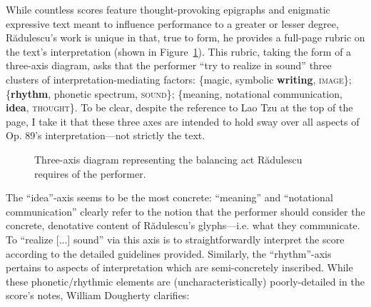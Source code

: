        While countless scores feature thought-provoking epigraphs and enigmatic expressive text meant to influence performance to a greater or lesser degree, R\u{a}dulescu's work is unique in that, true to form, he provides a full-page rubric on the text's interpretation (shown in Figure~\ref{fig:radulescu_triaxial}). This rubric, taking the form of a three-axis diagram, asks that the performer ``try to realize in sound'' three clusters of interpretation-mediating factors: \{magic, symbolic \textbf{writing}, \textsc{image}\}; \{\textbf{rhythm}, phonetic spectrum, \textsc{sound}\}; \{meaning, notational communication, \textbf{idea}, \textsc{thought}\}. To be clear, despite the reference to Lao Tzu at the top of the page, I take it that these three axes are intended to hold sway over all aspects of Op. 89's interpretation---not strictly the text.
        
        \begin{figure} 
            \centering
            \captionsetup{width=.5\textwidth}
            \caption[Three-axis diagram representing the balancing act Rădulescu requires of the performer.]{Three-axis diagram representing the balancing act Rădulescu requires of the performer.\footnotemark}
            \label{fig:radulescu_triaxial}
        \end{figure}
            
        The ``idea''-axis seems to be the most concrete: ``meaning'' and ``notational communication'' clearly refer to the notion that the performer should consider the concrete, denotative content of R\u{a}dulescu's glyphs---i.e. what they communicate. To ``realize [...] sound'' via this axis is to straightforwardly interpret the score according to the detailed guidelines provided. Similarly, the ``rhythm''-axis pertains to aspects of interpretation which are semi-concretely inscribed. While these phonetic/rhythmic elements are (uncharacteristically) poorly-detailed in the score's notes, William Dougherty clarifies:

